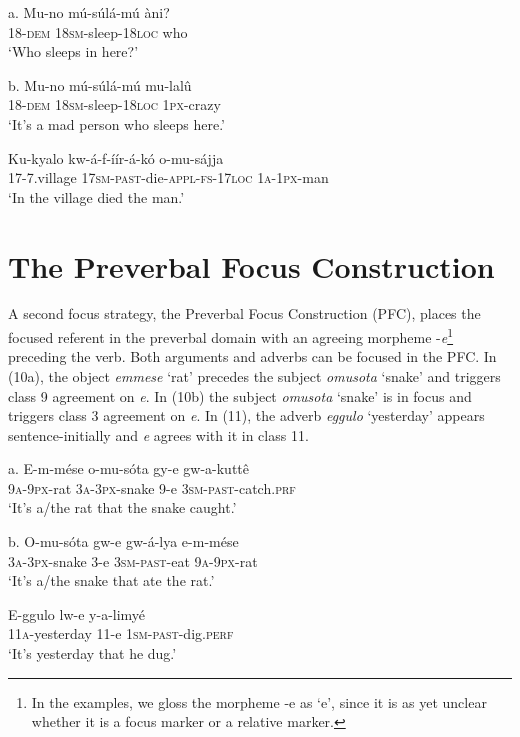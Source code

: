 \documentclass[output=paper]{langsci/langscibook}
\begin{document}
\ea
\gll a.  Mu-no    mú-súlá-mú    àni?\\
       18-\textsc{dem}  \textsc{18sm}-sleep-\textsc{18loc}  who\\
\glt   ‘Who sleeps in here?’
\z

\ea
\gll b.  Mu-no    mú-súlá-mú    mu-lalû\\
       18-\textsc{dem}  1\textsc{8sm}-sleep-\textsc{18loc}  \textsc{1px}-crazy\\
\glt   ‘It’s a mad person who sleeps here.’
\z

\ea
\gll Ku-kyalo  kw-á-f-íír-á-kó      o-mu-sájja\\
     17-7.village  \textsc{17sm}-\textsc{past}-die-\textsc{appl}-\textsc{fs}-\textsc{17loc}  \textsc{1a-1px}-man\\
\glt ‘In the village died the man.’
\z

\section{The Preverbal Focus Construction}
 

A second focus strategy, the Preverbal Focus Construction (PFC), places the focused referent in the preverbal domain with an agreeing morpheme -\textit{e}\footnote{In the examples, we gloss the morpheme -e as ‘e’, since it is as yet unclear whether it is a focus marker or a relative marker.}{} preceding the verb. Both arguments and adverbs can be focused in the PFC. In (10a), the object \textit{emmese} ‘rat’ precedes the subject \textit{omusota} ‘snake’ and triggers class 9 agreement on \textit{e}. In (10b) the subject \textit{omusota} ‘snake’ is in focus and triggers class 3 agreement on \textit{e}. In (11), the adverb \textit{eggulo} ‘yesterday’ appears sentence-initially and \textit{e} agrees with it in class 11.

\ea
\gll a.  E-m-mése  o-mu-sóta    gy-e  gw-a-kuttê{\textup{} }\\
       \textsc{9a-9px}-rat  \textsc{3a}-\textsc{3px}-snake  9-e  \textsc{3sm}-\textsc{past}-catch.\textsc{prf}\\
\glt   ‘It’s a/the rat that the snake caught.’
\z

\ea
\gll b.  O-mu-sóta    gw-e  gw-á-lya    e-m-mése\\
       \textsc{3a-3px}-snake  3-e  \textsc{3sm-past}-eat  \textsc{9a-9px}-rat\\
\glt   ‘It’s a/the snake that ate the rat.’
\z

\ea
\gll E-ggulo    lw-e  y-a-limyé\\
     11\textsc{a}-yesterday  11-e  \textsc{1sm}-\textsc{past}-dig.\textsc{perf}\\
\glt ‘It’s yesterday that he dug.’
\z
\end{document}

